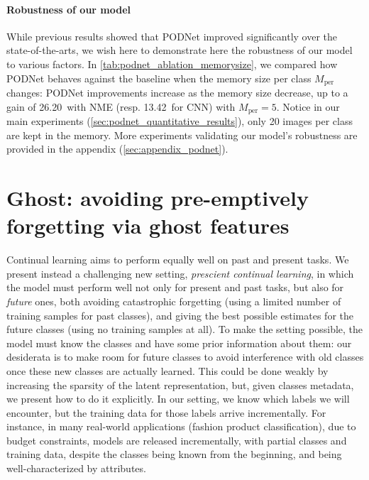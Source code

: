 \paragraph{Robustness of our model} While previous results showed that PODNet improved significantly
over the state-of-the-arts, we wish here to demonstrate here the robustness of our model to various
factors. In \autoref{tab:podnet_ablation_memorysize}, we compared how PODNet behaves against the
baseline when the memory size per class $M_{\text{per}}$ changes: PODNet improvements increase as
the memory size decrease, up to a gain of 26.20\pp\ with \ac{NME} (resp. 13.42\pp\ for CNN) with
$M_{\text{per}} = 5$. Notice in our main experiments (\autoref{sec:podnet_quantitative_results}),
only 20 images per class are kept in the memory. More experiments validating our model's robustness
are provided in the appendix (\autoref{sec:appendix_podnet}).






\FloatBarrier

\section{Ghost: avoiding pre-emptively forgetting via ghost features}
\label{sec:ghost}

Continual learning aims to perform equally well on past and present tasks. We present instead a
challenging new setting, \textit{prescient continual learning}, in which the model must perform well
not only for present and past tasks, but also for \textit{future} ones, both avoiding catastrophic
forgetting (using a limited number of training samples for past classes), and giving the best
possible estimates for the future classes (using no training samples at all). To make the setting
possible, the model must know the classes and have some prior information about them: our desiderata
is to make room for future classes to avoid interference with old classes once these new classes are
actually learned. This could be done weakly by increasing the sparsity of the latent representation,
but, given classes metadata, we present how to do it explicitly. In our setting, we know which
labels we will encounter, but the training data for those labels arrive incrementally. For instance,
in many real-world applications (\eg fashion product classification), due to budget constraints,
models are released incrementally, with partial classes and training data, despite the classes being
known from the beginning, and being well-characterized by attributes.

